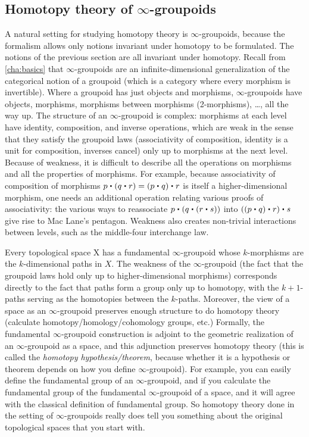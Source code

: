 \subsection{Homotopy theory of $\infty$-groupoids}

A natural setting for studying homotopy theory is $\infty$-groupoids, because
the formalism allows only notions invariant under homotopy to be formulated.
The notions of the previous section are all invariant under homotopy.
                                       Recall from \autoref{cha:basics}
that $\infty$-groupoids are an infinite-dimensional generalization of
the categorical notion of a groupoid (which is a category where every
morphism is invertible).  Where a groupoid has just objects and
morphisms, $\infty$-groupoids have objects, morphisms, morphisms between
morphisms (2-morphisms), \dots, all the way up.  The structure of an $\infty$-groupoid is
complex: morphisms at each level have identity, composition,
and inverse operations, which are weak in the sense that they satisfy
the groupoid laws (associativity of composition, identity is a unit for
composition, inverses cancel) only up to morphisms at the next level.
Because of weakness, it is difficult to describe all the
operations on morphisms and all the properties of morphisms.  For example, because associativity
of composition of morphisms $p \ct (q \ct r) = (p \ct q) \ct r$ is
itself a higher-dimensional morphism, one needs an additional operation
relating various proofs of associativity: the various
ways to reassociate $p \ct (q \ct (r \ct s))$ into $((p \ct q) \ct r)
\ct s$ give rise to Mac Lane's pentagon.  Weakness also creates
non-trivial interactions between levels, such as the middle-four
interchange law.

Every topological space X has a fundamental $\infty$-groupoid whose
$k$-morphisms are the $k$-dimensional paths in $X$.  The weakness of the
$\infty$-groupoid (the fact that the groupoid laws hold only up to
higher-dimensional morphisms) corresponds directly to the fact that
paths form a group only up to homotopy, with the $k+1$-paths serving as the
homotopies between the $k$-paths.  Moreover, the view of a space as an
$\infty$-groupoid preserves enough structure to do homotopy theory
(calculate homotopy/homology/cohomology groups, etc.)  Formally, the
fundamental $\infty$-groupoid construction is adjoint to the geometric
realization of an $\infty$-groupoid as a space, and this adjunction
preserves homotopy theory (this is called the \emph{homotopy
  hypothesis/theorem}, because whether it is a hypothesis or theorem
depends on how you define $\infty$-groupoid).  For example, you can
easily define the fundamental group of an $\infty$-groupoid, and if you
calculate the fundamental group of the fundamental $\infty$-groupoid of
a space, and it will agree with the classical definition of fundamental
group.  So homotopy theory done in the setting of $\infty$-groupoids
really does tell you something about the original topological spaces
that you start with.  

